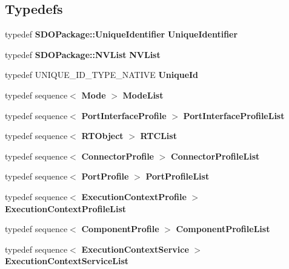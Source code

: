 \subsection*{Typedefs}
\begin{CompactItemize}
\item 
typedef {\bf SDOPackage::Unique\-Identifier} {\bf Unique\-Identifier}
\item 
typedef {\bf SDOPackage::NVList} {\bf NVList}
\item 
typedef UNIQUE\_\-ID\_\-TYPE\_\-NATIVE {\bf Unique\-Id}
\item 
typedef sequence$<$ {\bf Mode} $>$ {\bf Mode\-List}
\item 
typedef sequence$<$ {\bf Port\-Interface\-Profile} $>$ {\bf Port\-Interface\-Profile\-List}
\item 
typedef sequence$<$ {\bf RTObject} $>$ {\bf RTCList}
\item 
typedef sequence$<$ {\bf Connector\-Profile} $>$ {\bf Connector\-Profile\-List}
\item 
typedef sequence$<$ {\bf Port\-Profile} $>$ {\bf Port\-Profile\-List}
\item 
typedef sequence$<$ {\bf Execution\-Context\-Profile} $>$ {\bf Execution\-Context\-Profile\-List}
\item 
typedef sequence$<$ {\bf Component\-Profile} $>$ {\bf Component\-Profile\-List}
\item 
typedef sequence$<$ {\bf Execution\-Context\-Service} $>$ {\bf Execution\-Context\-Service\-List}
\end{CompactItemize}
